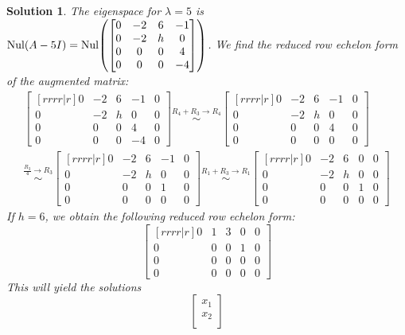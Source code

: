\documentclass[11pt]{scrartcl}
\theoremstyle{dotlessP}
\newtheorem{sol}{Solution}[section]
\theoremstyle{dotlessN}
\DeclarePairedDelimiter\paren{(}{)} %
\newcommand{\nul}{\text{Nul}}
\begin{document}
\begin{sol}
	The eigenspace for $\lambda = 5$ is $\nul(A - 5I) = \nul\paren*{
\begin{bmatrix}
	0 & -2 & 6 & -1 \\
	0 & -2 & h & 0 \\
	0 & 0 & 0 & 4 \\
	0 & 0 & 0 & -4
\end{bmatrix}
	}$. We find the reduced row echelon form of the augmented matrix:
	\begin{align*}
		\begin{bmatrix}[rrrr|r]
			0 & -2 & 6 & -1 & 0\\
			0 & -2 & h & 0 & 0 \\
			0 & 0 & 0 & 4 & 0\\
			0 & 0 & 0 & -4 & 0
		\end{bmatrix} \stackrel{R_4 + R_3 \to R_4}{\sim}
		\begin{bmatrix}[rrrr|r]
			0 & -2 & 6 & -1 & 0\\
			0 & -2 & h & 0 & 0 \\
			0 & 0 & 0 & 4 & 0\\
			0 & 0 & 0 & 0 & 0
		\end{bmatrix} \\
		\stackrel{\frac{R_3}{4} \to R_3}{\sim}
		\begin{bmatrix}[rrrr|r]
			0 & -2 & 6 & -1 & 0\\
			0 & -2 & h & 0 & 0 \\
			0 & 0 & 0 & 1 & 0\\
			0 & 0 & 0 & 0 & 0
		\end{bmatrix}
		\stackrel{R_1 + R_3 \to R_1}{\sim}
		\begin{bmatrix}[rrrr|r]
			0 & -2 & 6 & 0 & 0\\
			0 & -2 & h & 0 & 0 \\
			0 & 0 & 0 & 1 & 0\\
			0 & 0 & 0 & 0 & 0
		\end{bmatrix}
	\end{align*}
	If $h = 6$, we obtain the following reduced row echelon form:
	\[
		\begin{bmatrix}[rrrr|r]
		0 & 1 & 3 & 0 & 0 \\
		0 & 0 & 0 & 1 & 0 \\
		0 & 0 & 0 & 0 & 0 \\
		0 & 0 & 0 & 0 & 0 
	\end{bmatrix}
	\] 
	This will yield the solutions
	\[
	\begin{bmatrix}
	x_1 \\
	x_2 \\

\end{bmatrix}\]
\end{sol}
\end{document}
